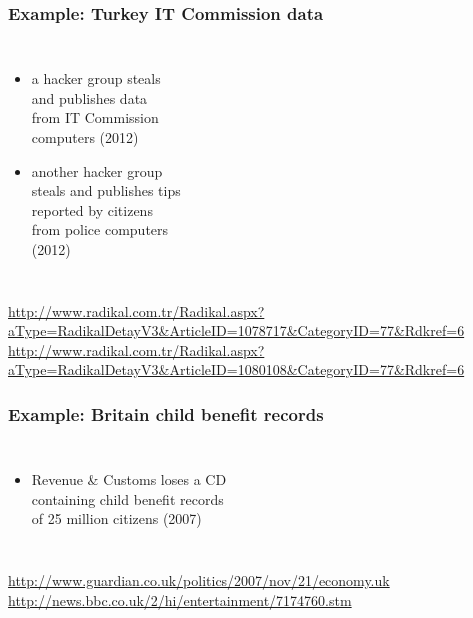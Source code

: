 \documentclass[dvipsnames]{beamer}
\theoremstyle{plain}
\begin{document}
\begin{frame}
  \frametitle{Example: Turkey IT Commission data}

  \begin{columns}

    \begin{itemize}
      \item a hacker group steals\\
        and publishes data\\
        from IT Commission\\
        computers (2012)
      \item another hacker group\\
        steals and publishes tips\\
        reported by citizens\\
        from police computers\\
        (2012)
    \end{itemize}
  \end{columns}

  \medskip
  \tiny{\url{http://www.radikal.com.tr/Radikal.aspx?aType=RadikalDetayV3&ArticleID=1078717&CategoryID=77&Rdkref=6}}\\
  \tiny{\url{http://www.radikal.com.tr/Radikal.aspx?aType=RadikalDetayV3&ArticleID=1080108&CategoryID=77&Rdkref=6}}\\
\end{frame}

\begin{frame}
  \frametitle{Example: Britain child benefit records}

  \begin{columns}

    \begin{itemize}
      \item Revenue \& Customs loses a CD\\
        containing child benefit records\\
        of 25 million citizens (2007)
    \end{itemize}
  \end{columns}

  \medskip
  \tiny{\url{http://www.guardian.co.uk/politics/2007/nov/21/economy.uk}}\\
  \tiny{\url{http://news.bbc.co.uk/2/hi/entertainment/7174760.stm}}\\
\end{frame}
\end{document}
